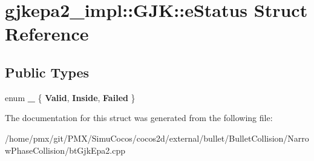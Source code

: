 \hypertarget{structgjkepa2__impl_1_1GJK_1_1eStatus}{}\section{gjkepa2\+\_\+impl\+:\+:G\+JK\+:\+:e\+Status Struct Reference}
\label{structgjkepa2__impl_1_1GJK_1_1eStatus}
\subsection*{Public Types}
\begin{DoxyCompactItemize}
\item 
\mbox{\label{structgjkepa2__impl_1_1GJK_1_1eStatus_a56e8a322d66d3609e32ab2ec93725af4}} 
enum {\bfseries \+\_\+} \{ {\bfseries Valid}, 
{\bfseries Inside}, 
{\bfseries Failed}
 \}
\end{DoxyCompactItemize}


The documentation for this struct was generated from the following file\+:\begin{DoxyCompactItemize}
\item 
/home/pmx/git/\+P\+M\+X/\+Simu\+Cocos/cocos2d/external/bullet/\+Bullet\+Collision/\+Narrow\+Phase\+Collision/bt\+Gjk\+Epa2.\+cpp\end{DoxyCompactItemize}
